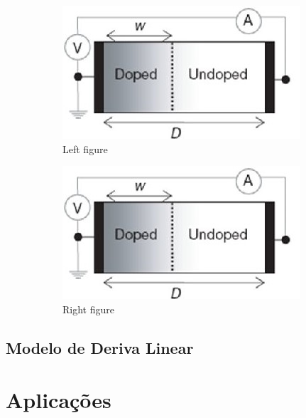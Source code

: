 \documentclass{ceel}
\begin{document}
\begin{multicols}{2}
\begin{figure}[H]
\begin{subfigure}{0.49\columnwidth}
\centering
\includegraphics[width=\columnwidth]{memristor-w}
\caption{Left figure} \label{fig:left}
\end{subfigure}
\hfill
\begin{subfigure}{0.49\columnwidth}
\centering
\includegraphics[width=\columnwidth]{memristor-w}
\caption{Right figure} \label{fig:right}
\end{subfigure}

\caption{}\label{}
\end{figure}



\subsection{Modelo de Deriva Linear}


\section{Aplicações}\label{aplicacoes}

\end{multicols}
\end{document}
